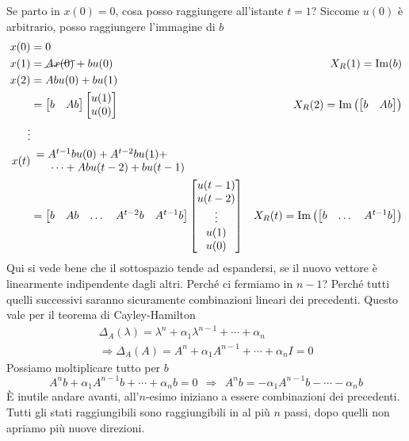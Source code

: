 \documentclass[10pt,a4paper]{book}
\begin{document}
Se parto in $x( 0) =0$, cosa posso raggiungere all'istante $t=1$? Siccome $u( 0)$ è arbitrario, posso raggiungere l'immagine di $b$
\begin{equation*}
\begin{aligned}
x( 0) & =0 & \\
x( 1) & =\cancel{Ax( 0)} +bu( 0) & X_R( 1) =\mathrm{Im}( b)\\
x( 2) & =Abu( 0) +bu( 1) & \\
 & =\begin{bmatrix}
b & Ab
\end{bmatrix}\begin{bmatrix}
u( 1)\\
u( 0)
\end{bmatrix} & X_R( 2) =\mathrm{Im}\left(\begin{bmatrix}
b & Ab
\end{bmatrix}\right)\\
\vdots  &  & \\
x(t) &  \begin{array}{l}
=A^{t-1} bu( 0) +A^{t-2} bu( 1) +\\
\ \ \ \ \cdots +Abu( t-2) +bu( t-1)
\end{array} & \\
 & =\begin{bmatrix}
b & Ab & \dotsc  & A^{t-2} b & A^{t-1} b
\end{bmatrix}\begin{bmatrix}
u( t-1)\\
u( t-2)\\
\vdots \\
u( 1)\\
u( 0)
\end{bmatrix} & X_R(t) =\mathrm{Im}\left(\begin{bmatrix}
b & \dotsc  & A^{t-1} b
\end{bmatrix}\right)
\end{aligned}
\end{equation*}
Qui si vede bene che il sottospazio tende ad espandersi, se il nuovo vettore è linearmente indipendente dagli altri. Perché ci fermiamo in $n-1$? Perché tutti quelli successivi saranno sicuramente combinazioni lineari dei precedenti. Questo vale per il teorema di Cayley-Hamilton
\begin{gather*}
\Delta _A( \lambda ) =\lambda ^n +\alpha _1 \lambda ^{n-1} +\cdots +\alpha _n\\
\Rightarrow \Delta _A( A) =A^n +\alpha _1 A^{n-1} +\cdots +\alpha _n I=0
\end{gather*}
Possiamo moltiplicare tutto per $b$
\begin{equation*}
A^n b+\alpha _1 A^{n-1} b+\cdots +\alpha _n b=0\ \ \Rightarrow \ \ A^n b=-\alpha _1 A^{n-1} b-\cdots -\alpha _n b
\end{equation*}
È inutile andare avanti, all'$n$-esimo iniziano a essere combinazioni dei precedenti. Tutti gli stati raggiungibili sono raggiungibili in al più $n$ passi, dopo quelli non apriamo più nuove direzioni.
\end{document}
